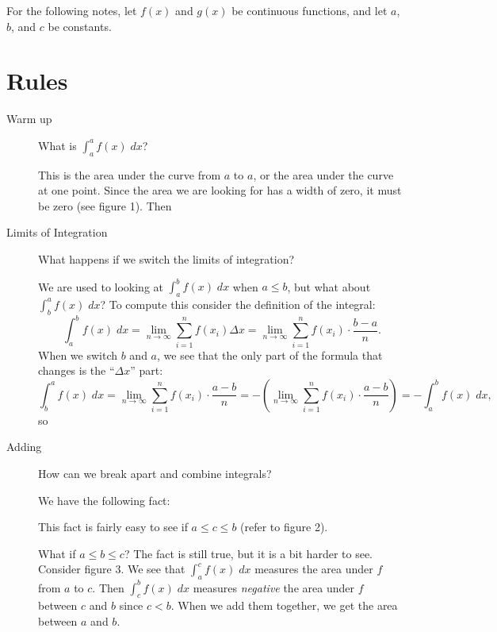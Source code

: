 \documentclass[11pt]{article}
\begin{document}
\drawtitle

For the following notes, let $f(x)$ and $g(x)$ be continuous
functions, and let $a$, $b$, and $c$ be constants.

\section*{Rules}
\begin{description}
\item[Warm up] What is $\int_a^a f(x)\;dx$?

  This is the area under the curve from $a$ to $a$, or the area under
  the curve at one point.  Since the area we are looking for has a
  width of zero, it must be zero (see figure 1).  Then
  \begin{center}
  \end{center}

\item[Limits of Integration] What happens if we switch the limits of
  integration?

  We are used to looking at $\int_a^b f(x)\; dx$ when $a\leq b$, but
  what about $\int_b^a f(x)\; dx$?  To compute this consider the
  definition of the integral:
  \[
  \int_a^b f(x)\; dx = \lim_{n\to\infty} \sum_{i=1}^n f(x_i)\Delta x =
  \lim_{n\to\infty} \sum_{i=1}^n f(x_i)\cdot\frac{b-a}{n}.
  \]
  When we switch $b$ and $a$, we see that the only part of the formula
  that changes is the ``$\Delta x$'' part:
  \[
  \int_b^a f(x)\; dx = \lim_{n\to\infty} \sum_{i=1}^n f(x_i)
  \cdot\frac{a-b}{n} = -\left(\lim_{n\to\infty} \sum_{i=1}^n f(x_i)
    \cdot\frac{a-b}{n}\right)=-\int_a^b f(x)\; dx,
  \]
  so
  \begin{center}
  \end{center}

\item[Adding] How can we break apart and combine integrals?

  We have the following fact:
  \begin{center}
  \end{center}
  This fact is fairly easy to see if $a\leq c\leq b$ (refer to figure
  2).

  What if $a\leq b \leq c$?  The fact is still true, but it is a bit
  harder to see.  Consider figure 3.  We see that $\int_a^c f(x)\; dx$
  measures the area under $f$ from $a$ to $c$.  Then $\int_c^b f(x)\;
  dx$ measures \emph{negative} the area under $f$ between $c$ and $b$
  since $c<b$.  When we add them together, we get the area between $a$
  and $b$.


\end{description}
\end{document}
